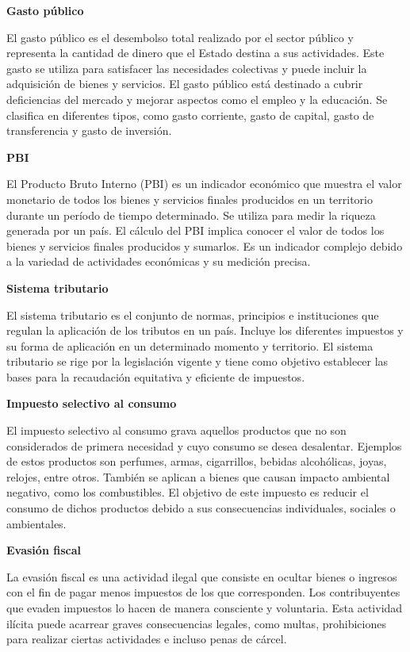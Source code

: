 \documentclass[
  letterpaper,
  DIV=11,
  numbers=noendperiod]{scrartcl}
\begin{document}
\textbf{Gasto público}

El gasto público es el desembolso total realizado por el sector público
y representa la cantidad de dinero que el Estado destina a sus
actividades. Este gasto se utiliza para satisfacer las necesidades
colectivas y puede incluir la adquisición de bienes y servicios. El
gasto público está destinado a cubrir deficiencias del mercado y mejorar
aspectos como el empleo y la educación. Se clasifica en diferentes
tipos, como gasto corriente, gasto de capital, gasto de transferencia y
gasto de inversión.

\textbf{PBI}

El Producto Bruto Interno (PBI) es un indicador económico que muestra el
valor monetario de todos los bienes y servicios finales producidos en un
territorio durante un período de tiempo determinado. Se utiliza para
medir la riqueza generada por un país. El cálculo del PBI implica
conocer el valor de todos los bienes y servicios finales producidos y
sumarlos. Es un indicador complejo debido a la variedad de actividades
económicas y su medición precisa.

\textbf{Sistema tributario}

El sistema tributario es el conjunto de normas, principios e
instituciones que regulan la aplicación de los tributos en un país.
Incluye los diferentes impuestos y su forma de aplicación en un
determinado momento y territorio. El sistema tributario se rige por la
legislación vigente y tiene como objetivo establecer las bases para la
recaudación equitativa y eficiente de impuestos.

\textbf{Impuesto selectivo al consumo}

El impuesto selectivo al consumo grava aquellos productos que no son
considerados de primera necesidad y cuyo consumo se desea desalentar.
Ejemplos de estos productos son perfumes, armas, cigarrillos, bebidas
alcohólicas, joyas, relojes, entre otros. También se aplican a bienes
que causan impacto ambiental negativo, como los combustibles. El
objetivo de este impuesto es reducir el consumo de dichos productos
debido a sus consecuencias individuales, sociales o ambientales.

\textbf{Evasión fiscal}

La evasión fiscal es una actividad ilegal que consiste en ocultar bienes
o ingresos con el fin de pagar menos impuestos de los que corresponden.
Los contribuyentes que evaden impuestos lo hacen de manera consciente y
voluntaria. Esta actividad ilícita puede acarrear graves consecuencias
legales, como multas, prohibiciones para realizar ciertas actividades e
incluso penas de cárcel.
\end{document}
